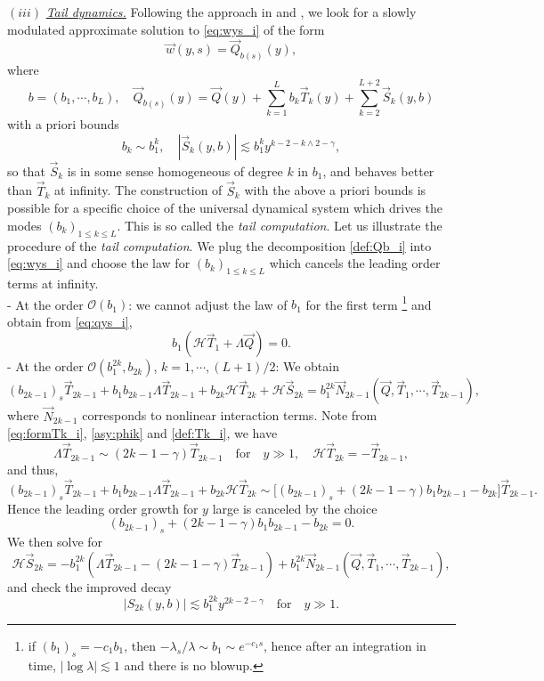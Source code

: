 \documentclass[11pt]{aims}
\theoremstyle{definition}
\numberwithin{equation}{section}
\begin{document}
\noindent $(iii)$ \underline{\textit{Tail dynamics.}} Following the approach in \cite{IGN16} and \cite{MRRcjm15}, we look for a slowly modulated approximate solution to \eqref{eq:wys_i} of the form 
$$\vec w(y,s) = \vec Q_{b(s)}(y),$$
where 
\begin{equation}\label{def:Qb_i}
b = (b_1, \cdots, b_L), \quad \vec Q_{b(s)}(y) = \vec Q(y) + \sum_{k = 1}^Lb_k\vec T_k(y) + \sum_{k = 2}^{L+2}\vec S_k(y,b)
\end{equation}
with a priori bounds
$$b_k \sim b_1^k, \quad |\vec S_k(y,b)| \lesssim b_1^k y^{k - 2 -  k\wedge 2 - \gamma},$$
so that $\vec S_k$ is in some sense homogeneous of degree $k$ in $b_1$, and behaves better than $\vec T_k$ at infinity. The construction of $\vec S_k$ with the above a priori bounds is possible for a specific choice of the universal dynamical system which drives the modes $(b_k)_{1 \leq k \leq L}$. This is so called the \textit{tail computation}. Let us illustrate the procedure of the \textit{tail computation}. We plug the decomposition \eqref{def:Qb_i} into \eqref{eq:wys_i} and choose the law for $(b_k)_{1 \leq k \leq L}$ which cancels the  leading order terms at infinity.\\
- At the order ${\mathcal{O}}(b_1)$: we cannot adjust the law of $b_1$ for the first term \footnote{if $(b_1)_s = -c_1 b_1$, then $-\lambda_s/\lambda \sim b_1 \sim e^{-c_1 s}$, hence after an integration in time, $|\log \lambda| \lesssim 1$ and there is no blowup.} and obtain from \eqref{eq:qys_i}, 
$$b_1({\mathscr{H}} \vec T_1 + \Lambda \vec Q) = 0.$$
- At the order ${\mathcal{O}}(b_1^{2k}, b_{2k})$, $k = 1, \cdots, (L+1)/2$: We obtain
$$(b_{2k - 1})_s\vec T_{2k - 1} + b_1 b_{2k - 1}\Lambda \vec T_{2k - 1} + b_{2k}{\mathscr{H}} \vec T_{2k} + {\mathscr{H}} \vec S_{2k} = b_1^{2k} \vec N_{2k - 1}(\vec Q, \vec T_1, \cdots, \vec T_{2k - 1}),$$
where $\vec N_{2k - 1}$ corresponds to nonlinear interaction terms. Note from \eqref{eq:formTk_i}, \eqref{asy:phik} and \eqref{def:Tk_i}, we have
$$\Lambda \vec T_{2k - 1} \sim (2k - 1 - \gamma)\vec T_{2k - 1} \quad \text{for}\quad y \gg 1, \quad {\mathscr{H}} \vec T_{2k} = - \vec T_{2k - 1},$$
and thus, 
$$(b_{2k - 1})_s \vec T_{2k - 1} + b_1 b_{2k - 1}\Lambda \vec T_{2k -1} + b_{2k}{\mathscr{H}} \vec T_{2k} \sim \big[(b_{2k - 1})_s + (2k - 1 - \gamma)b_1 b_{2k - 1} - b_{2k}\big]\vec T_{2k - 1}.$$
Hence the leading order growth for $y$ large is canceled by the choice 
$$(b_{2k-1})_s + (2k - 1 - \gamma)b_1 b_{2k - 1} - b_{2k} = 0.$$
We then solve for 
$${\mathscr{H}} \vec S_{2k} = -b_1^{2k}(\Lambda \vec T_{2k - 1} - (2k - 1 - \gamma)\vec T_{2k - 1}) + b_1^{2k} \vec N_{2k - 1}(\vec Q, \vec T_1, \cdots, \vec T_{2k - 1}),$$
and check the improved decay 
$$|S_{2k}(y,b)| \lesssim b_1^{2k}y^{2k - 2 - \gamma} \quad \text{for} \quad y \gg 1.$$
\end{document}
